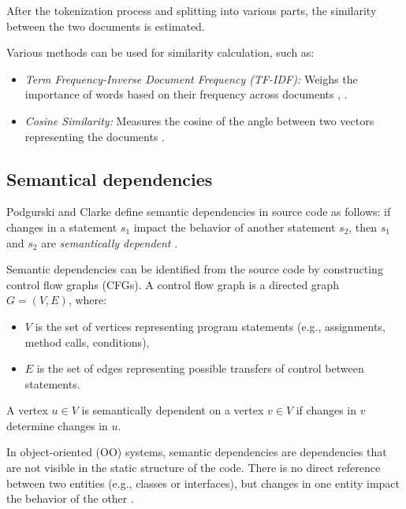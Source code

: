After the tokenization process and splitting into various parts, the similarity between the two documents is estimated. 

Various methods can be used for similarity calculation, such as:
\begin{itemize}
    \item \textit{Term Frequency-Inverse Document Frequency (TF-IDF):} Weighs the importance of words based on their frequency across documents \cite{lexical-dep}, \cite{corazza2}.
    \item \textit{Cosine Similarity:} Measures the cosine of the angle between two vectors representing the documents \cite{lexical-dep-Prajapati}.
\end{itemize}






\subsection{Semantical dependencies}

\hspace{4em} Podgurski and Clarke define semantic dependencies in source code as follows: if changes in a statement \(s_1\) impact the behavior of another statement \(s_2\), then \(s_1\) and \(s_2\) are \emph{semantically dependent} \cite{Podgurski-semantic}.

Semantic dependencies can be identified from the source code by constructing control flow graphs (CFGs). A control flow graph is a directed graph \(G = (V, E)\), where:
\begin{itemize}
    \item \(V\) is the set of vertices representing program statements (e.g., assignments, method calls, conditions),
    \item \(E\) is the set of edges representing possible transfers of control between statements.
\end{itemize}

A vertex \(u \in V\) is semantically dependent on a vertex \(v \in V\) if changes in \(v\) determine changes in \(u\).

In object-oriented (OO) systems, semantic dependencies are dependencies that are not visible in the static structure of the code. There is no direct reference between two entities (e.g., classes or interfaces), but changes in one entity impact the behavior of the other \cite{Neto-semantic-dep, Capiluppi-semantic-dep, Poshyvanyk2009}. 


